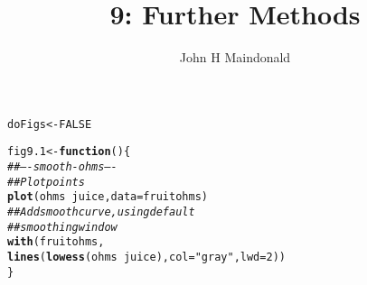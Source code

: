 \documentclass[12pt, a4paper,  BCOR=8.25mm, DIV=15]{scrartcl}\usepackage[]{graphicx}\usepackage[]{color}
\makeatletter
\newcommand{\hlnum}[1]{\textcolor[rgb]{0.686,0.059,0.569}{#1}}%
\newcommand{\hlstr}[1]{\textcolor[rgb]{0.192,0.494,0.8}{#1}}%
\newcommand{\hlcom}[1]{\textcolor[rgb]{0.678,0.584,0.686}{\textit{#1}}}%
\newcommand{\hlopt}[1]{\textcolor[rgb]{0,0,0}{#1}}%
\newcommand{\hlstd}[1]{\textcolor[rgb]{0.345,0.345,0.345}{#1}}%
\newcommand{\hlkwa}[1]{\textcolor[rgb]{0.161,0.373,0.58}{\textbf{#1}}}%
\newcommand{\hlkwb}[1]{\textcolor[rgb]{0.69,0.353,0.396}{#1}}%
\newcommand{\hlkwc}[1]{\textcolor[rgb]{0.333,0.667,0.333}{#1}}%
\newcommand{\hlkwd}[1]{\textcolor[rgb]{0.737,0.353,0.396}{\textbf{#1}}}%
\newenvironment{kframe}{%
 \def\at@end@of@kframe{}%
 \ifinner\ifhmode%
  \def\at@end@of@kframe{\end{minipage}}%
  \begin{minipage}{\columnwidth}%
 \fi\fi%
 \def\FrameCommand##1{\hskip\@totalleftmargin \hskip-\fboxsep
 \colorbox{shadecolor}{##1}\hskip-\fboxsep
     \hskip-\linewidth \hskip-\@totalleftmargin \hskip\columnwidth}%
 \MakeFramed {\advance\hsize-\width
   \@totalleftmargin\z@ \linewidth\hsize
   \@setminipage}}%
 {\par\unskip\endMakeFramed%
 \at@end@of@kframe}
\newenvironment{knitrout}{}{} %
\makeatother
\begin{document}



\title{9: Further Methods}
\author{John H Maindonald}
\maketitle
\vspace{-0.5cm}

\begin{knitrout}
\color{fgcolor}\begin{kframe}
\begin{alltt}
\hlstd{doFigs} \hlkwb{<-} \hlnum{FALSE}
\end{alltt}
\end{kframe}
\end{knitrout}
\vspace{-0.5cm}

\begin{knitrout}
\color{fgcolor}\begin{kframe}
\begin{alltt}
\hlstd{fig9.1} \hlkwb{<-} \hlkwa{function}\hlstd{()\{}
\hlcom{## ---- smooth-ohms ----}
\hlcom{## Plot points}
\hlkwd{plot}\hlstd{(ohms} \hlopt{~} \hlstd{juice,} \hlkwc{data}\hlstd{=fruitohms)}
\hlcom{## Add smooth curve, using default}
\hlcom{## smoothing window}
\hlkwd{with}\hlstd{(fruitohms,}
     \hlkwd{lines}\hlstd{(}\hlkwd{lowess}\hlstd{(ohms} \hlopt{~} \hlstd{juice),} \hlkwc{col}\hlstd{=}\hlstr{"gray"}\hlstd{,} \hlkwc{lwd}\hlstd{=}\hlnum{2}\hlstd{))}
\hlstd{\}}
\end{alltt}
\end{kframe}
\end{knitrout}
\end{document}
